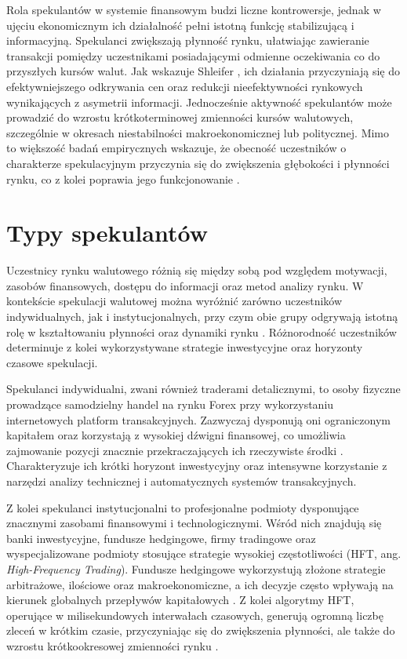 Rola spekulantów w systemie finansowym budzi liczne kontrowersje, jednak w ujęciu ekonomicznym ich działalność pełni istotną funkcję stabilizującą i informacyjną. 
Spekulanci zwiększają płynność rynku, ułatwiając zawieranie transakcji pomiędzy uczestnikami posiadającymi odmienne oczekiwania co do przyszłych kursów walut. 
Jak wskazuje Shleifer \parencite{shleifer2000}, ich działania przyczyniają się do efektywniejszego odkrywania cen oraz redukcji nieefektywności rynkowych wynikających z asymetrii informacji. 
Jednocześnie aktywność spekulantów może prowadzić do wzrostu krótkoterminowej zmienności kursów walutowych, szczególnie w okresach niestabilności makroekonomicznej lub politycznej. 
Mimo to większość badań empirycznych wskazuje, że obecność uczestników o charakterze spekulacyjnym przyczynia się do zwiększenia głębokości i płynności rynku, co z kolei poprawia jego funkcjonowanie \parencite{ mishkin2019}.

\section{Typy spekulantów}

Uczestnicy rynku walutowego różnią się między sobą pod względem motywacji, zasobów finansowych, dostępu do informacji oraz metod analizy rynku. 
W kontekście spekulacji walutowej można wyróżnić zarówno uczestników indywidualnych, jak i instytucjonalnych, przy czym obie grupy odgrywają istotną rolę w kształtowaniu płynności oraz dynamiki rynku \parencite{hull2018}. 
Różnorodność uczestników determinuje z kolei wykorzystywane strategie inwestycyjne oraz horyzonty czasowe spekulacji.

Spekulanci indywidualni, zwani również traderami detalicznymi, to osoby fizyczne prowadzące samodzielny handel na rynku Forex przy wykorzystaniu internetowych platform transakcyjnych. 
Zazwyczaj dysponują oni ograniczonym kapitałem oraz korzystają z wysokiej dźwigni finansowej, co umożliwia zajmowanie pozycji znacznie przekraczających ich rzeczywiste środki \parencite{elder2014}. 
Charakteryzuje ich krótki horyzont inwestycyjny oraz intensywne korzystanie z narzędzi analizy technicznej i automatycznych systemów transakcyjnych. 

Z kolei spekulanci instytucjonalni to profesjonalne podmioty dysponujące znacznymi zasobami finansowymi i technologicznymi. 
Wśród nich znajdują się banki inwestycyjne, fundusze hedgingowe, firmy tradingowe oraz wyspecjalizowane podmioty stosujące strategie wysokiej częstotliwości (HFT, ang. \emph{High-Frequency Trading}). 
Fundusze hedgingowe wykorzystują złożone strategie arbitrażowe, ilościowe oraz makroekonomiczne, a ich decyzje często wpływają na kierunek globalnych przepływów kapitałowych \parencite{fabozzi2015}. 
Z kolei algorytmy HFT, operujące w milisekundowych interwałach czasowych, generują ogromną liczbę zleceń w krótkim czasie, przyczyniając się do zwiększenia płynności, 
ale także do wzrostu krótkookresowej zmienności rynku \parencite{aldridge2013}.

